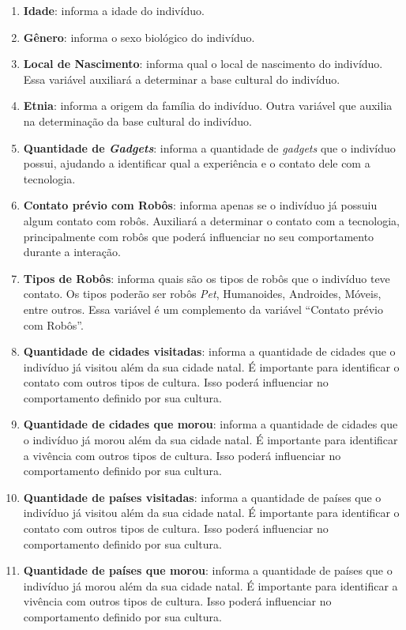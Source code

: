 \begin{enumerate}
	\item \textbf{Idade}: informa a idade do indivíduo.
	\item \textbf{Gênero}: informa o sexo biológico do indivíduo.
	\item \textbf{Local de Nascimento}: informa qual o local de nascimento do indivíduo. Essa variável auxiliará a determinar a base cultural do indivíduo.
	\item \textbf{Etnia}: informa a origem da família do indivíduo. Outra variável que auxilia na determinação da base cultural do indivíduo.
	\item \textbf{Quantidade de \emph{Gadgets}}: informa a quantidade de \emph{gadgets} que o indivíduo possui, ajudando a identificar qual a experiência e o contato dele com a tecnologia.
	\item \textbf{Contato prévio com Robôs}: informa apenas se o indivíduo já possuiu algum contato com robôs. Auxiliará a determinar o contato com a tecnologia, principalmente com robôs que poderá influenciar no seu comportamento durante a interação.
	\item \textbf{Tipos de Robôs}: informa quais são os tipos de robôs que o indivíduo teve contato. Os tipos poderão ser robôs \emph{Pet}, Humanoides, Androides, Móveis, entre outros. Essa variável é um complemento da variável ``Contato prévio com Robôs''.
	\item \textbf{Quantidade de cidades visitadas}: informa a quantidade de cidades que o indivíduo já visitou além da sua cidade natal. É importante para identificar o contato com outros tipos de cultura. Isso poderá influenciar no comportamento definido por sua cultura.
	\item \textbf{Quantidade de cidades que morou}: informa a quantidade de cidades que o indivíduo já morou além da sua cidade natal. É importante para identificar a vivência com outros tipos de cultura. Isso poderá influenciar no comportamento definido por sua cultura.
	\item \textbf{Quantidade de países visitadas}: informa a quantidade de países que o indivíduo já visitou além da sua cidade natal. É importante para identificar o contato com outros tipos de cultura. Isso poderá influenciar no comportamento definido por sua cultura.
	\item \textbf{Quantidade de países que morou}: informa a quantidade de países que o indivíduo já morou além da sua cidade natal. É importante para identificar a vivência com outros tipos de cultura. Isso poderá influenciar no comportamento definido por sua cultura.
\end{enumerate}

